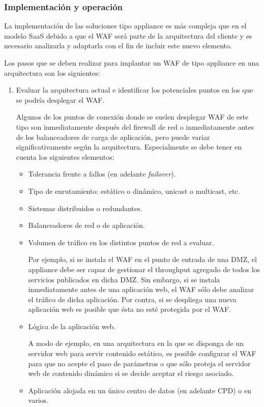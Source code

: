 \subsubsection{Implementación y operación}
\par La implementación de las soluciones tipo appliance es más compleja que en el modelo SaaS debido a que el WAF será parte de la arquitectura del cliente 
y es necesario analizarla y adaptarla con el fin de incluir este nuevo elemento.
\par Los pasos que se deben realizar para implantar un WAF de tipo appliance en una arquitectura son los siguientes:

\begin{enumerate}
  \item Evaluar la arquitectura actual e identificar los potenciales puntos en los que se podría desplegar el WAF.
    \par Algunos de los puntos de conexión donde se suelen desplegar WAF de este tipo son inmediatamente después del firewall de red o
    inmediatamente antes de los balanceadores de carga de aplicación, pero puede variar significativamente según la arquitectura. Especialmente se debe
    tener en cuenta los siguientes elementos:
    \begin{itemize}
      \item Tolerancia frente a fallos (en adelante {\em failover}).
      \item Tipo de enrutamiento: estático o dinámico, unicast o multicast, etc.
      \item Sistemas distribuidos o redundantes.
      \item Balanceadores de red o de aplicación.
      \item Volumen de tráfico en los distintos puntos de red a evaluar.
        \par Por ejemplo, si se instala el WAF en el punto de entrada de una DMZ, el appliance debe ser capaz de gestionar el throughput
        agregado de todos los servicios publicados en dicha DMZ. Sin embargo, si se instala inmediatamente antes de una aplicación web, el WAF
        sólo debe analizar el tráfico de dicha aplicación. Por contra, si se despliega una nueva aplicación web es posible que ésta no esté
        protegida por el WAF.
      \item Lógica de la aplicación web.
        \par A modo de ejemplo, en una arquitectura en la que se disponga de un  servidor web para servir contenido estático, es posible
        configurar el WAF para que no acepte el paso de parámetros o que sólo proteja el servidor web de contenido dinámico si se decide
        aceptar el riesgo asociado.
      \item Aplicación alojada en un único centro de datos (en adelante CPD) o en varios.
    \end{itemize}


\end{enumerate}
